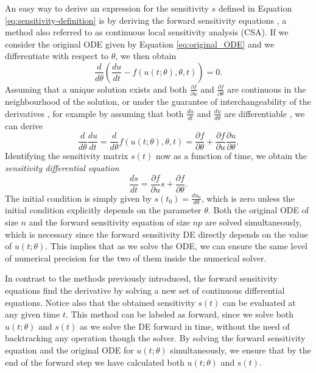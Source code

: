 An easy way to derive an expression for the sensitivity $s$ defined in Equation \eqref{eq:sensitivity-definition} is by deriving the forward sensitivity equations \cite{ramsay2017dynamic}, a method also referred to as continuous local sensitivity analysis (CSA). 
If we consider the original ODE given by Equation \eqref{eq:original_ODE} and we differentiate with respect to $\theta$, we then obtain
\begin{equation}
    \frac{d}{d\theta} \left( \frac{du}{dt}  - f(u(t; \theta), \theta, t) \right) = 0.
\end{equation}
Assuming that a unique solution exists and both $\frac{\partial f}{\partial u}$ and $\frac{\partial f}{\partial \theta}$ are continuous in the neighbourhood of the solution, or under the guarantee of interchangeability of the derivatives \cite{gronwall1919note}, for example by assuming that both $\frac{du}{dt}$ and $\frac{du}{d\theta}$ are differentiable \cite{math8111947}, we can derive
\begin{equation}
 \frac{d}{d\theta} \frac{du}{dt} 
 =
 \frac{d}{d\theta} f(u(t; \theta), \theta, t)
 = 
 \frac{\partial f}{\partial \theta}
 + 
 \frac{\partial f}{\partial u} \frac{\partial u}{\partial \theta}.
\end{equation}
Identifying the sensitivity matrix $s(t)$ now as a function of time, we obtain the \textit{sensitivity differential equation} 
\begin{equation}
 \frac{ds}{dt} = \frac{\partial f}{\partial u} s + \frac{\partial f}{\partial \theta}.
 \label{eq:sensitivity_equations}
\end{equation}
The initial condition is simply given by $s(t_0) = \frac{du_0}{d\theta}$, which is zero unless the initial condition explicitly depends on the parameter $\theta$.
Both the original ODE of size $n$ and the forward sensitivity equation of size $np$ are solved simultaneously, which is necessary since the forward sensitivity DE directly depends on the value of $u(t; \theta)$.  
This implies that as we solve the ODE, we can ensure the same level of numerical precision for the two of them inside the numerical solver.

In contrast to the methods previously introduced, the forward sensitivity equations find the derivative by solving a new set of continuous differential equations.
Notice also that the obtained sensitivity $s(t)$ can be evaluated at any given time $t$. 
This method can be labeled as forward, since we solve both $u(t; \theta)$ and $s(t)$ as we solve the DE forward in time, without the need of backtracking any operation though the solver.
By solving the forward sensitivity equation and the original ODE for $u(t; \theta)$ simultaneously, we ensure that by the end of the forward step we have calculated both $u(t; \theta)$ and $s(t)$. 